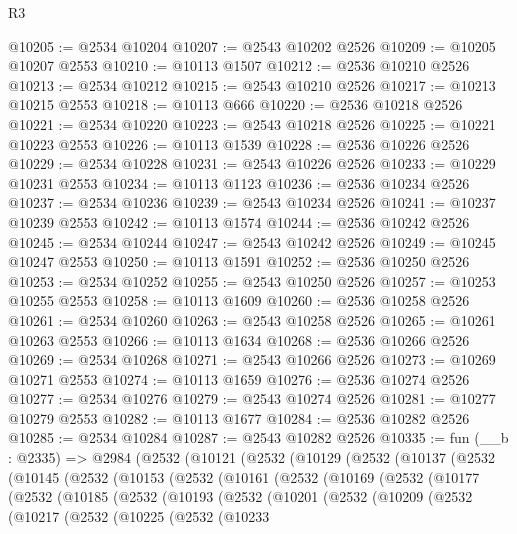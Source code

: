 \begin{lexlean}{R3}
\begin{coremodule}
@10205 := @2534 @10204
@10207 := @2543 @10202 @2526
@10209 := @10205 @10207 @2553
@10210 := @10113 @1507
@10212 := @2536 @10210 @2526
@10213 := @2534 @10212
@10215 := @2543 @10210 @2526
@10217 := @10213 @10215 @2553
@10218 := @10113 @666
@10220 := @2536 @10218 @2526
@10221 := @2534 @10220
@10223 := @2543 @10218 @2526
@10225 := @10221 @10223 @2553
@10226 := @10113 @1539
@10228 := @2536 @10226 @2526
@10229 := @2534 @10228
@10231 := @2543 @10226 @2526
@10233 := @10229 @10231 @2553
@10234 := @10113 @1123
@10236 := @2536 @10234 @2526
@10237 := @2534 @10236
@10239 := @2543 @10234 @2526
@10241 := @10237 @10239 @2553
@10242 := @10113 @1574
@10244 := @2536 @10242 @2526
@10245 := @2534 @10244
@10247 := @2543 @10242 @2526
@10249 := @10245 @10247 @2553
@10250 := @10113 @1591
@10252 := @2536 @10250 @2526
@10253 := @2534 @10252
@10255 := @2543 @10250 @2526
@10257 := @10253 @10255 @2553
@10258 := @10113 @1609
@10260 := @2536 @10258 @2526
@10261 := @2534 @10260
@10263 := @2543 @10258 @2526
@10265 := @10261 @10263 @2553
@10266 := @10113 @1634
@10268 := @2536 @10266 @2526
@10269 := @2534 @10268
@10271 := @2543 @10266 @2526
@10273 := @10269 @10271 @2553
@10274 := @10113 @1659
@10276 := @2536 @10274 @2526
@10277 := @2534 @10276
@10279 := @2543 @10274 @2526
@10281 := @10277 @10279 @2553
@10282 := @10113 @1677
@10284 := @2536 @10282 @2526
@10285 := @2534 @10284
@10287 := @2543 @10282 @2526
@10335 := fun (__b : @2335) =>
  @2984
    (@2532
      (@10121
        (@2532
          (@10129
            (@2532
              (@10137
                (@2532
                  (@10145
                    (@2532
                      (@10153
                        (@2532
                          (@10161
                            (@2532
                              (@10169
                                (@2532
                                  (@10177
                                    (@2532
                                      (@10185
                                        (@2532
                                          (@10193
                                            (@2532
                                              (@10201
                                                (@2532
                                                  (@10209
                                                    (@2532
                                                      (@10217
                                                        (@2532
                                                          (@10225
                                                            (@2532
                                                              (@10233

\end{coremodule}
\end{lexlean}
